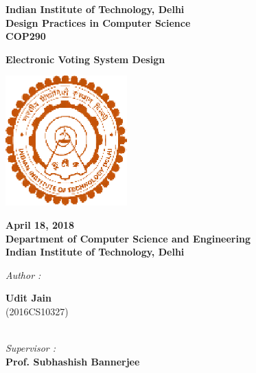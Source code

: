 \documentclass[12pt]{report}
\begin{document}
\begin{center}
\LARGE{\textbf{Indian Institute of Technology, Delhi}}\\
\vspace{0.8cm}
\large{\textbf{Design Practices in Computer Science}}\\[5pt]
\large{\textbf{COP290}}\\[5pt]

\vspace{0.5cm}

\large{\textbf{Electronic Voting System Design}}

\begin{center}
\includegraphics[height=5cm]{iitd.eps}
\end{center}
\vspace{0.2cm}

\textbf{April 18, 2018} \\
\textbf{Department of Computer Science and Engineering} \\
\textbf{Indian Institute of Technology, Delhi}\\


\vspace{1.5cm}

\begin{multicols*}{2}

\begin{flushleft}

\textit{Author :\\ }


\textbf{Udit Jain} \\
(2016CS10327)\\

\end{flushleft}


\columnbreak

\begin{flushleft}

\textit{\\Supervisor :\\ }
\textbf{Prof. Subhashish Bannerjee} \\[5pt]

\end{flushleft}

\end{multicols*}

\end{center}
\end{document}
